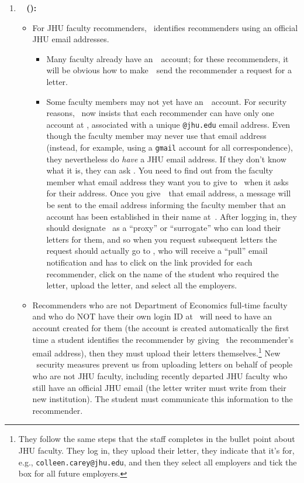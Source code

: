 \documentclass{\econtex}
\begin{document}
\begin{enumerate}

\item \textbf{\EJM ~ (\EJMLink):}
  \begin{itemize}
  \item For JHU faculty recommenders, {\EJM}~identifies recommenders using
    an official JHU email addresses.  

    \begin{itemize}
    \item Many faculty already have an~\EJM~account; for these
      recommenders, it will be obvious how to make~\EJM~send the
      recommender a request for a letter.

    \item Some faculty members may not yet have an~\EJM~account.  For security reasons, \EJM~now insists that each recommender can have only one account at \EJM, associated with a unique \texttt{@jhu.edu} email address.  Even though the faculty member may never use that email address (instead, for example, using a \texttt{gmail} account for all correspondence), they nevertheless do \textit{ have} a JHU email address.  If they don't know what it is, they can ask \jmstaffemail.  You need to find out from the faculty member what email address they want you to give to \EJM~when it asks for their address.  Once you give~\EJM~that email address, a message will be sent to the email address informing the faculty member that an account has been established in their name at~\EJM.  After logging in, they should designate \jmstaffemail~as a ``proxy'' or ``surrogate'' who can load their letters for them, and so when you request subsequent letters the request should actually go to \jmstaffemail, who will receive a ``pull'' email notification and has to click on the link provided for each recommender, click on the name of the student who required the letter, upload the letter, and select all the employers.
    \end{itemize}

  \item Recommenders who are not Department of Economics full-time faculty and who do NOT have their own
    login ID at \EJM~will need to have an account created for them (the account is created automatically the first time a student identifies the recommender by giving \EJM~the recommender's email address), then they must upload their letters themselves.\footnote{They follow the same steps that the
      staff completes in the bullet point about JHU faculty.  They
      log in, they upload their letter, they indicate that it's for, e.g.,
      \texttt{colleen.carey@jhu.edu}, and then they select all employers and tick the box for all
      future employers.}
    New \EJM~security measures prevent us from uploading letters on behalf of people
    who are not JHU faculty, including recently departed JHU faculty who still have an official JHU email (the letter writer must write from their new institution).  The student must communicate this information to  the recommender.


\end{itemize}
\end{enumerate}
\end{document}
